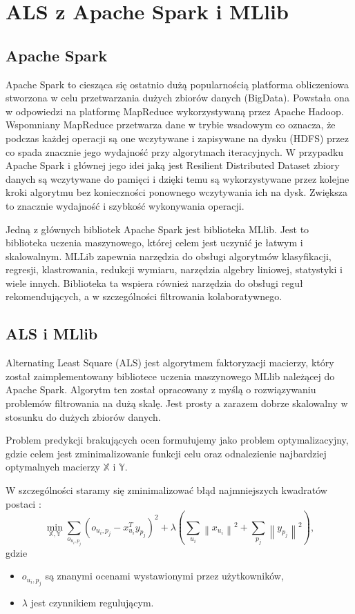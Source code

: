 \documentclass[12pt,a4paper]{report}
\newcommand{\norm}[2][]{\left\| {#2} \right\|_{#1}}
\begin{document}
\section{ALS z Apache Spark i MLlib}
\subsection{Apache Spark}
Apache Spark to ciesząca się ostatnio dużą popularnością platforma obliczeniowa stworzona w celu przetwarzania dużych zbiorów danych (BigData). Powstała ona w odpowiedzi na platformę MapReduce wykorzystywaną przez Apache Hadoop. Wspomniany MapReduce przetwarza dane w trybie wsadowym co oznacza, że podczas każdej operacji są one wczytywane i zapisywane na dysku (HDFS) przez co spada znacznie jego wydajność przy algorytmach iteracyjnych. W przypadku Apache Spark i głównej jego idei jaką jest 
Resilient Distributed Dataset zbiory danych są wczytywane do pamięci i dzięki temu są wykorzystywane przez kolejne kroki algorytmu bez konieczności ponownego wczytywania ich na dysk. Zwiększa to znacznie wydajność i szybkość wykonywania operacji.

Jedną z głównych bibliotek Apache Spark jest biblioteka MLlib. Jest to biblioteka uczenia maszynowego, której celem jest uczynić je łatwym i skalowalnym. MLLib zapewnia narzędzia do obsługi algorytmów klasyfikacji, regresji, klastrowania, redukcji wymiaru, narzędzia algebry liniowej, statystyki i wiele innych. Biblioteka ta wspiera również narzędzia do obsługi reguł rekomendujących, a w szczególności filtrowania kolaboratywnego.

\subsection{ALS i MLlib}
Alternating Least Square (ALS) jest algorytmem faktoryzacji macierzy, który został zaimplementowany bibliotece uczenia maszynowego MLlib należącej do Apache Spark. Algorytm ten został opracowany z myślą o rozwiązywaniu problemów filtrowania na dużą skalę. Jest prosty a zarazem dobrze skalowalny w stosunku do dużych zbiorów danych.

Problem predykcji brakujących ocen formułujemy jako problem optymalizacyjny, gdzie celem jest zminimalizowanie funkcji celu oraz odnalezienie najbardziej optymalnych macierzy $\mathbb{X}$ i $\mathbb{Y}$. 

W szczególności staramy się zminimalizować błąd najmniejszych kwadratów postaci {\citep{mcvals}}:
$$
\min_{\mathbb{X}, \mathbb{Y}} \sum_{o_{u_i,p_j}} (o_{u_i,p_j} - x_{u_i}^Ty_{p_j})^2 + \lambda (\sum_{u_i} \norm{x_{u_i}}^2 + \sum_{p_j} \norm{y_{p_j}}^2),
$$
gdzie 
\begin{itemize}
\item $o_{u_i,p_j}$ są znanymi ocenami wystawionymi przez użytkowników,
\item $\lambda$ jest czynnikiem regulującym.
\end{itemize}
\end{document}
